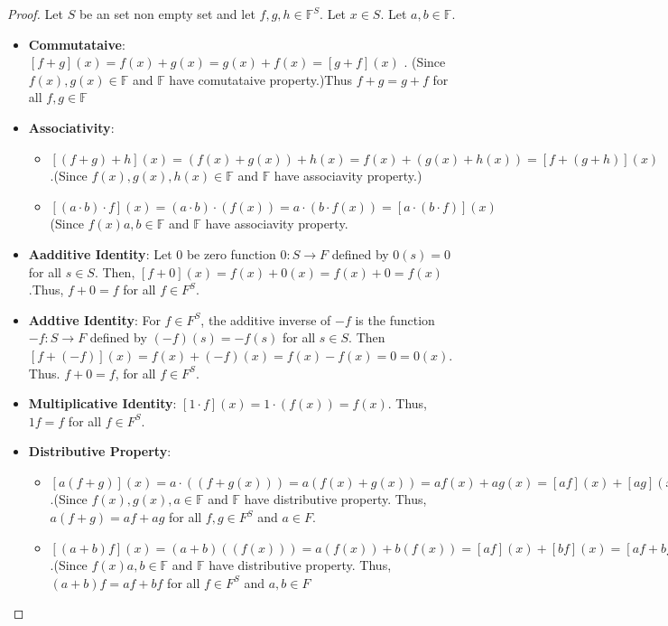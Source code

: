 \documentclass[
]{book}
\providecommand{\tightlist}{%
  \setlength{\itemsep}{0pt}\setlength{\parskip}{0pt}}
\theoremstyle{definition}
\theoremstyle{definition}
\theoremstyle{definition}
\theoremstyle{definition}
\theoremstyle{remark}
\begin{document}
\begin{proof}

Let \(S\) be an set non empty set and let \(f,g,h \in \mathbb{F}^S\). Let \(x\in S\). Let \(a,b\in \mathbb{F}\).

\begin{itemize}
\tightlist
\item
  \textbf{Commutataive}: \([f+g](x)=f(x)+g(x)=g(x)+f(x)=[g+f](x)\) . (Since \(f(x),g(x)\in \mathbb{F}\) and \(\mathbb{F}\) have comutataive property.)Thus \(f+g=g+f\) for all \(f,g\in \mathbb{F}\)
\item
  \textbf{Associativity}:

  \begin{itemize}
  \tightlist
  \item
    \([(f+g)+h](x)=(f(x)+g(x))+h(x)=f(x)+(g(x)+h(x))=[f+(g+h)](x)\).(Since \(f(x),g(x),h(x)\in \mathbb{F}\) and \(\mathbb{F}\) have associavity property.)
  \item
    \([(a\cdot b)\cdot f](x)=(a\cdot b)\cdot (f(x))=a\cdot (b\cdot f(x))=[a\cdot (b\cdot f)](x)\)
    (Since \(f(x)a,b\in \mathbb{F}\) and \(\mathbb{F}\) have associavity property.
  \end{itemize}
\item
  \textbf{Aadditive Identity}: Let \(0\) be zero function \(0 \colon S \rightarrow F\) defined by \(0(s) = 0\) for all \(s \in S\). Then, \([f+0](x)=f(x)+0(x)=f(x)+0=f(x)\).Thus, \(f+0=f\) for all \(f\in F^S\).
\item
  \textbf{Addtive Identity}: For \(f \in F^S\), the additive inverse of \(-f\) is the function \(-f \colon S \rightarrow F\) defined by \((-f)(s) = -f(s)\) for all \(s \in S\).
  Then \([f+(-f)](x)=f(x)+(-f)(x)=f(x)-f(x)=0=0(x)\). Thus. \(f+0=f\), for all \(f\in F^S\).
\item
  \textbf{Multiplicative Identity}: \([1\cdot f](x)=1\cdot(f(x))=f(x)\). Thus, \(1f=f\) for all \(f\in F^S\).
\item
  \textbf{Distributive Property}:

  \begin{itemize}
  \tightlist
  \item
    \([a(f+g)](x)=a\cdot ((f+g(x)))=a(f(x)+g(x))=af(x)+ag(x)=[af](x)+[ag](x)=[af+ag](x)\).(Since \(f(x),g(x),a\in \mathbb{F}\) and \(\mathbb{F}\) have distributive property. Thus, \(a(f+g)=af+ag\) for all \(f,g\in F^S\) and \(a\in F\).
  \item
    \([(a+b)f](x)=(a+b)((f(x)))=a(f(x))+b(f(x))=[af](x)+[bf](x)=[af+bf](x)\).(Since \(f(x)a,b\in \mathbb{F}\) and \(\mathbb{F}\) have distributive property. Thus, \((a+b)f=af+bf\) for all \(f\in F^S\) and \(a,b\in F\)
  \end{itemize}
\end{itemize}

\end{proof}
\end{document}
